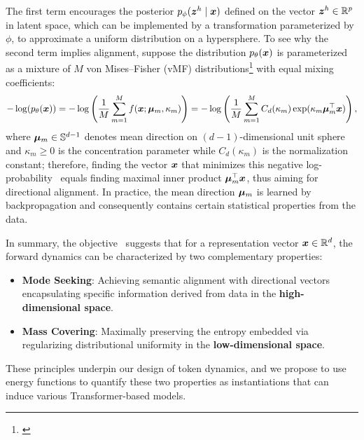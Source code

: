 The first term encourages the posterior $p_\phi({\bm{z}}^h \mid {\bm{x}})$ defined on the vector ${\bm{z}}^h \in \mathbb{R}^p$ in latent space, which can be implemented by a transformation parameterized by $\phi$, to approximate a uniform distribution on a hypersphere. To see why the second term implies alignment, suppose the distribution $p_\theta({\bm{x}})$ is parameterized as a mixture of $M$ von Mises–Fisher (vMF) distributions\footnote{\href{https://en.wikipedia.org/wiki/Von_Mises–Fisher_distribution}{}} with equal mixing coefficients:
\begin{equation}
\label{eq:vMF}
-\log(p_\theta({\bm{x}})) = -\log\left(\frac{1}{M} \sum_{m=1}^M f({\bm{x}}; {\bm{\mu}}_m, \kappa_m) \right)= -\log\left(\frac{1}{M} \sum_{m=1}^M C_{d}(\kappa_m)\exp(\kappa_m {\bm{\mu}}_m^\top{\bm{x}})\right),
\end{equation}
where ${\bm{\mu}}_m \in \mathbb{S}^{d-1}$ denotes mean direction on $(d-1)$-dimensional unit sphere and $\kappa_m \geq 0$ is the concentration parameter while $C_{d}(\kappa_m)$ is the normalization constant; therefore, finding the vector ${\bm{x}}$ that minimizes this negative log-probability~ equals finding maximal inner product ${\bm{\mu}}_m^\top{\bm{x}}$, thus aiming for directional alignment. In practice, the mean direction ${\bm{\mu}}_m$ is learned by backpropagation and consequently contains certain statistical properties from the data. 

In summary, the objective~ suggests that for a representation vector ${\bm{x}} \in \mathbb{R}^d$, the forward dynamics can be characterized by two complementary properties: 
\begin{itemize}[leftmargin=*]
    \item \textbf{Mode Seeking}: Achieving semantic alignment with directional vectors encapsulating specific information derived from data in the \textbf{high-dimensional space}.
    \item \textbf{Mass Covering}: Maximally preserving the entropy embedded via regularizing distributional uniformity in the \textbf{low-dimensional space}.
\end{itemize}
These principles underpin our design of token dynamics, and we propose to use energy functions to quantify these two properties as instantiations that can induce various Transformer-based models. 